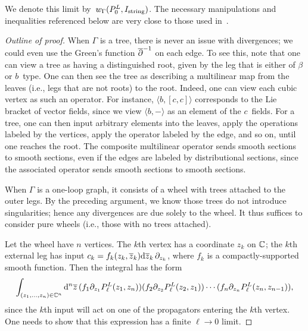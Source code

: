 We denote this limit by~$w_{\Gamma}(P_{0}^L,I_{\rm string})$. 
The necessary manipulations and inequalities referenced below are very close to those used in~\cite{wg2, GGW}.

\begin{proof}[Outline of proof]
When $\Gamma$ is a tree, there is never an issue with divergences; 
we could even use the Green's function $\overline{\partial}^{-1}$ on each edge.
To see this, note that one can view a tree as having a distinguished root,
given by the leg that is either of $\beta$ or $b$~type.
One can then see the tree as describing a multilinear map from the leaves (i.e., legs that are not roots) to the root.
Indeed, one can view each cubic vertex as such an operator.
For instance, $\langle b, [c,c]\rangle$ corresponds to the Lie bracket of vector fields,
since we view $\langle b,-\rangle$ as an element of the $c$~fields.
For a tree, one can then input arbitrary elements into the leaves, 
apply the operations labeled by the vertices,
apply the operator labeled by the edge, and so on,
until one reaches the root.
The composite multilinear operator sends smooth sections to smooth sections,
even if the edges are labeled by distributional sections,
since the associated operator sends smooth sections to smooth sections.

When $\Gamma$ is a one-loop graph, it consists of a wheel with trees attached to the outer legs.
By the preceding argument, we know those trees do not introduce singularities;
hence any divergences are due solely to the wheel.
It thus suffices to consider pure wheels (i.e., those with no trees attached).

Let the wheel have $n$ vertices. 
The $k$th vertex has a coordinate $z_k$ on $\mathbb C$;
the $k$th external leg has input $c_k = f_k(z_k,\overline{z}_k) {\rm d}\overline{z}_k\, \partial_{z_k}$, 
where $f_k$ is a compactly-supported smooth function.
Then the integral has the form
\[
\int_{(z_1,\ldots,z_n) \in \mathbb C^n}{\rm d}^n \overline{z} \,(f_1  \partial_{z_1} P_\ell^L(z_1,z_n))(f_2 \partial_{z_2} P_\ell^L(z_2,z_1)) \cdots (f_n\partial_{z_n} P_\ell^L(z_n,z_{n-1})),
\] 
since the $k$th input will act on one of the propagators entering the $k$th vertex.
One needs to show that this expression has a finite $\ell \to 0$ limit.


\end{proof}
